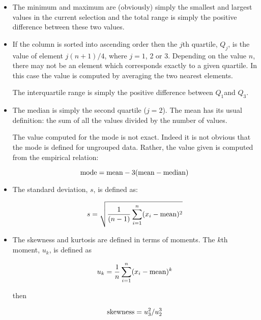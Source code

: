 \documentclass[twoside,11pt]{article}
\renewcommand{\_}{\texttt{\symbol{95}}}
\begin{document}
\begin{itemize}

  \item The minimum and maximum are (obviously) simply the smallest and
   largest values in the current selection and the total range is simply
   the positive difference between these two values.

  \item If the column is sorted into ascending order then the $j$th quartile,
   $Q_{j}$, is the value of element $j(n + 1)/4$, where $j = 1$, 2 or 3.
   Depending on the value $n$, there may not be an element which
   corresponds exactly to a given quartile.  In this case the value is
   computed by averaging the two nearest elements.

   The interquartile range is simply the positive difference between 
   $Q_{1}$and $Q_{3}$.

  \item The median is simply the second quartile ($j = 2$).  The mean has
   its usual definition: the sum of all the values divided by the number
   of values.

   The value computed for the mode is not exact.  Indeed it is not
   obvious that the mode is defined for ungrouped data.  Rather, the value
   given is computed from the empirical relation:

  \begin{equation}
   {\rm mode} = {\rm mean} - 3({\rm mean} - {\rm median})
  \end{equation}

  \item The standard deviation, $s$, is defined as:


  \begin{equation}
   s = \sqrt{ \frac{1}{(n - 1)} \sum_{i=1}^{n} (x_{i} - {\rm mean})^2 }
  \end{equation}

  \item The skewness and kurtosis are defined in terms of moments.  The
   $k$th moment, $u_{k}$, is defined as

  \begin{equation}
   u_{k} = \frac{1}{n} \sum_{i=1}^{n} (x_{i} - {\rm mean})^{k}
  \end{equation}

   then

  \begin{equation}
   {\rm skewness} = u_{3}^{2} / u_{2}^{3}
  \end{equation}


\end{itemize}
\end{document}
